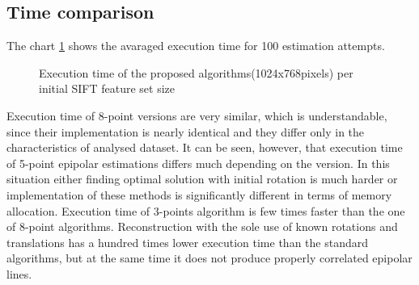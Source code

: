 \subsection{Time comparison}
The chart \ref{plot:ExecutionTime} shows the avaraged  execution time for 100 estimation attempts.
\begin{figure}[hb!]
  \begin{center}
    \caption{Execution time of the proposed algorithms(1024x768pixels) per initial SIFT feature set size}
    \label{plot:ExecutionTime}
  \end{center}
\end{figure}
Execution time of 8-point versions are very similar, which is understandable, since their implementation is nearly identical and they differ only in the characteristics of analysed dataset. It can be seen, however, that execution time of 5-point epipolar estimations differs much depending on the version. In this situation either finding optimal solution with initial rotation is much harder or implementation of these methods is significantly different in terms of memory allocation. Execution time of 3-points algorithm is few times faster than the one of 8-point algorithms. Reconstruction with the sole use of known rotations and translations has a hundred times lower execution time than the standard algorithms, but at the same time it does not produce properly correlated epipolar lines.

